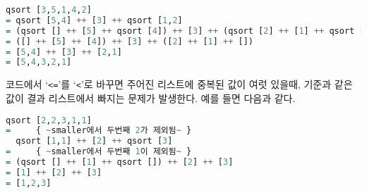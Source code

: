 \begin{lstlisting}[language=Haskell]
  qsort [3,5,1,4,2]
= qsort [5,4] ++ [3] ++ qsort [1,2]
= (qsort [] ++ [5] ++ qsort [4]) ++ [3] ++ (qsort [2] ++ [1] ++ qsort [])
= ([] ++ [5] ++ [4]) ++ [3] ++ ([2] ++ [1] ++ [])
= [5,4] ++ [3] ++ [2,1]
= [5,4,3,2,1]
\end{lstlisting}


코드에서 `\texttt{<=}'를 `\texttt{<}'로 바꾸면 주어진 리스트에 중복된 값이 여럿
있을때, 기준과 같은 값이 결과 리스트에서 빠지는 문제가 발생한다. 예를 들면
다음과 같다.

\begin{lstlisting}[language=Haskell,escapeinside=~~]
  qsort [2,2,3,1,1]
=     { ~smaller에서 두번째 2가 제외됨~ }
  qsort [1,1] ++ [2] ++ qsort [3]
=     { ~smaller에서 두번째 1이 제외됨~ }
= (qsort [] ++ [1] ++ qsort []) ++ [2] ++ [3]
= [1] ++ [2] ++ [3]
= [1,2,3]
\end{lstlisting}


